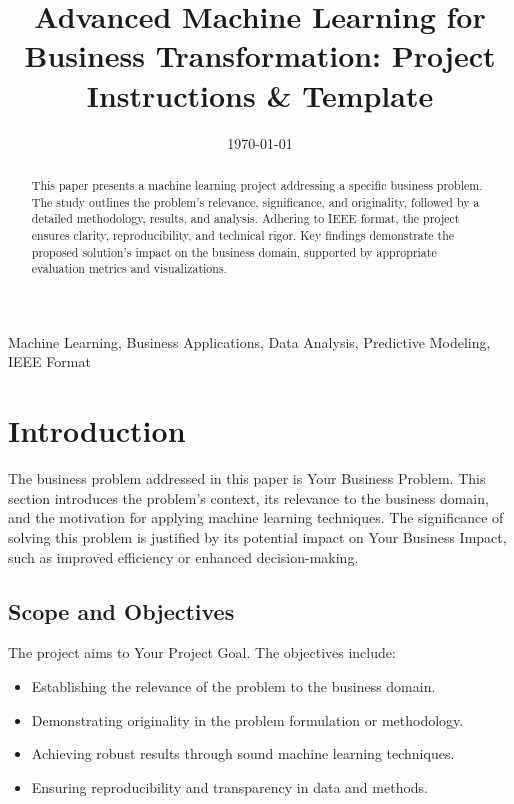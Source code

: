\documentclass[conference]{IEEEtran}
\begin{document}
\title{Advanced Machine Learning for Business Transformation: Project Instructions \& Template}
\author{
}

\date{\today}

\maketitle

\begin{abstract}
This paper presents a machine learning project addressing a specific business problem. The study outlines the problem's relevance, significance, and originality, followed by a detailed methodology, results, and analysis. Adhering to IEEE format, the project ensures clarity, reproducibility, and technical rigor. Key findings demonstrate the proposed solution's impact on the business domain, supported by appropriate evaluation metrics and visualizations.
\end{abstract}

\begin{IEEEkeywords}
Machine Learning, Business Applications, Data Analysis, Predictive Modeling, IEEE Format
\end{IEEEkeywords}

\section{Introduction}
The business problem addressed in this paper is Your Business Problem. This section introduces the problem's context, its relevance to the business domain, and the motivation for applying machine learning techniques. The significance of solving this problem is justified by its potential impact on Your Business Impact, such as improved efficiency or enhanced decision-making.

\subsection{Scope and Objectives}\label{subsub:lists}
The project aims to Your Project Goal. The objectives include:
\begin{itemize}
    \item Establishing the relevance of the problem to the business domain.
    \item Demonstrating originality in the problem formulation or methodology.
    \item Achieving robust results through sound machine learning techniques.
    \item Ensuring reproducibility and transparency in data and methods.
\end{itemize}
\end{document}
